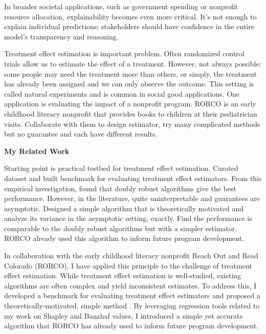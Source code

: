 \documentclass[11pt]{article}
\begin{document}
{In broader societal applications, such as government spending or nonprofit resource allocation, explainability becomes even more critical. It’s not enough to explain individual predictions; stakeholders should have confidence in the entire model’s transparency and reasoning. 

Treatment effect estimation is important problem.
Often randomized control trials allow us to estimate the effect of a treatment.
However, not always possible: some people may need the treatment more than others, or simply, the treatment has already been assigned and we can only observe the outcome.
This setting is called natural experiments and is common in social good applications.
One application is evaluating the impact of a nonprofit program.
RORCO is an early childhood literacy nonprofit that provides books to children at their pediatrician visits.
Collaborate with them to design estimator, try many complicated methods but no guarantee and each have different results.


{ \large \textbf{My Related Work}}

Starting point is practical testbed for treatment effect estimation.
Curated dataset and built benchmark for evaluating treatment effect estimators.
From this empirical investigation, found that doubly robust algorithms give the best performance.
However, in the literature, quite uninterpretable and guarantees are asymptotic.
Designed a simple algorithm that is theoretically motivated and analyze its variance in the asymptotic setting, exactly.
Find the performance is comparable to the doubly robust algorithms but with a simpler estimator.
RORCO already used this algorithm to inform future program development.

In collaboration with the early childhood literacy nonprofit Reach Out and Read Colorado (RORCO), I have applied this principle to the challenge of treatment effect estimation. While treatment effect estimation is well-studied, existing algorithms are often complex and yield inconsistent estimates. To address this, I developed a benchmark for evaluating treatment effect estimators and proposed a theoretically-motivated, simple method \cite{witter2024benchmarking}. By leveraging regression tools related to my work on Shapley and Banzhaf values, I introduced a simple yet accurate algorithm that RORCO has already used to inform future program development.

}
\end{document}
